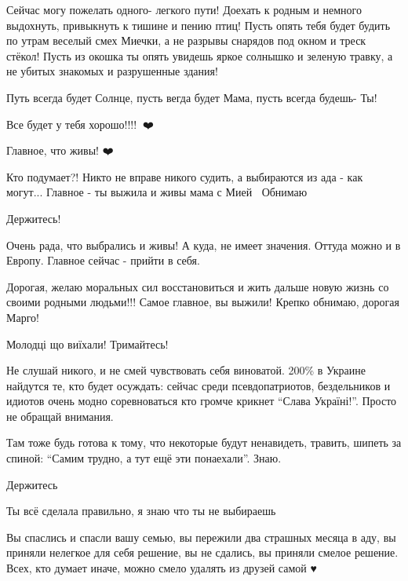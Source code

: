 Сейчас могу пожелать одного- легкого пути! Доехать к родным и немного
выдохнуть, привыкнуть к тишине и пению птиц! Пусть опять тебя будет будить по
утрам веселый смех Миечки, а не разрывы снарядов под окном и треск стёкол!
Пусть из окошка ты опять увидешь яркое солнышко и зеленую травку, а не убитых
знакомых и разрушенные здания!

Путь всегда будет Солнце, пусть вегда будет Мама, пусть всегда будешь- Ты!

Все будет у тебя хорошо!!!!🙏🙏❤️💋


Главное, что живы! ❤️


Кто подумает?! Никто не вправе никого судить, а выбираются из ада - как могут...
Главное - ты выжила и живы мама с Мией🙏🏻 Обнимаю


Держитесь!


Очень рада, что выбрались и живы! А куда, не имеет значения. Оттуда можно и в
Европу. Главное сейчас - прийти в себя.


Дорогая, желаю моральных сил восстановиться и жить дальше новую жизнь со своими
родными людьми!!! Самое главное, вы выжили! Крепко обнимаю, дорогая Марго!


Молодці що виїхали! Тримайтесь!


Не слушай никого, и не смей чувствовать себя виноватой. 200\% в Украине найдутся
те, кто будет осуждать: сейчас среди псевдопатриотов, бездельников и идиотов
очень модно соревноваться кто громче крикнет \enquote{Слава Україні!}. Просто не
обращай внимания.

Там тоже будь готова к тому, что некоторые будут ненавидеть, травить, шипеть за
спиной: \enquote{Самим трудно, а тут ещё эти понаехали}. Знаю.


Держитесь 🙏


Ты всё сделала правильно, я знаю что ты не выбираешь


Вы спаслись и спасли вашу семью, вы пережили два страшных месяца в аду, вы
приняли нелегкое для себя решение, вы не сдались, вы приняли смелое решение.
Всех, кто думает иначе, можно смело удалять из друзей самой ♥️

